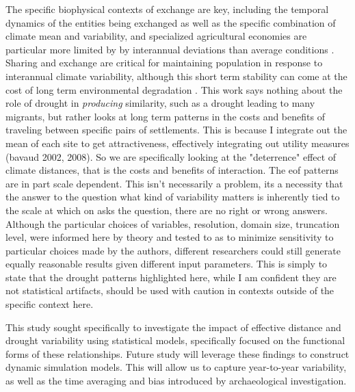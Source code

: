 \documentclass[11pt]{wlscirep}
\begin{document}
The specific biophysical contexts of exchange are key, including the temporal dynamics of the entities being exchanged as well as the specific combination of climate mean and variability, and specialized agricultural economies are particular more limited by by interannual deviations than average conditions \cite{Freeman2014}. Sharing and exchange are critical for maintaining population in response to interannual climate variability, although this short term stability can come at the cost of long term environmental degradation \cite{Janssen2010}.
This work says nothing about the role of drought in \textit{producing} similarity, such as a drought leading to many migrants, but rather looks at long term patterns in the costs and benefits of traveling between specific pairs of settlements. This is because I integrate out the mean of each site to get attractiveness, effectively integrating out utility measures (bavaud 2002, 2008). So we are specifically looking at the "deterrence" effect of climate distances, that is the costs and benefits of interaction.
The eof patterns are in part scale dependent. This isn't necessarily a problem, its a necessity that the answer to the question what kind of variability matters is inherently tied to the scale at which on asks the question, there are no right or wrong answers. Although the particular choices of variables, resolution, domain size, truncation level, were informed here by theory and tested to as to minimize sensitivity to particular choices made by the authors, different researchers could still generate equally reasonable results given  different input parameters.  This is simply to state that the drought patterns highlighted here, while I am confident they are not statistical artifacts, should be used with caution in contexts outside of the specific context here.

This study sought specifically to investigate the impact of effective distance and drought variability using statistical models, specifically focused on the functional forms of these relationships. Future study will leverage these findings to construct dynamic simulation models. This will allow us to capture year-to-year variability, as well as the time averaging and bias introduced by archaeological investigation.
\end{document}
